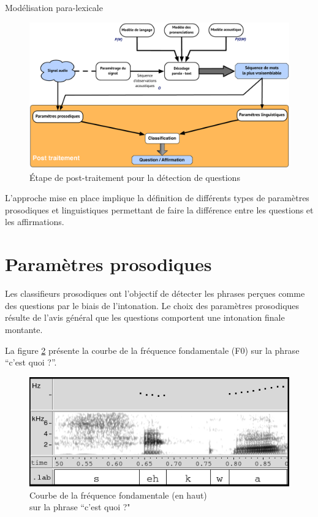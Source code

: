 \documentclass{style/these}
\begin{document}
\begin{part}{Modélisation para-lexicale}
\begin{figure}[h!]
\centering
\includegraphics[scale=0.38]{images/pictures/QD_last.pdf}
\caption{Étape de post-traitement pour la détection de questions}
\label{Fig:QD}
\end{figure}

L'approche mise en place implique la définition de différents types de paramètres prosodiques et linguistiques permettant de faire la différence entre les questions et les affirmations.  

\minitoc


\section{Paramètres prosodiques}
\renewcommand{\rightmark}{Paramètres prosodiques}

Les classifieurs prosodiques ont l'objectif de détecter les phrases perçues comme des questions par le biais de l'intonation. 
Le choix des paramètres prosodiques résulte de l'avis général que les questions comportent une intonation finale montante.

La figure \ref{Fig:F0-quoi} présente la courbe de la fréquence fondamentale (F0) sur la phrase ``c'est quoi ?''.

\begin{figure}[h!]
\centering
\includegraphics[scale=0.48]{images/pictures/quoi-F0-v2.png}
\caption{Courbe de la fréquence fondamentale (en haut) \\sur la phrase ``c'est quoi ?"}
\label{Fig:F0-quoi}
\end{figure}


\end{part}
\end{document}
